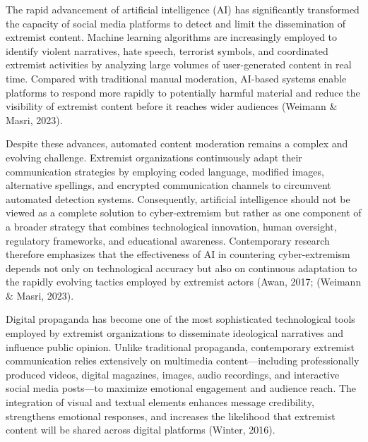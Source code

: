 \documentclass[10pt]{NSP1}
\begin{document}
\par\medskip{}\smallskip

The rapid advancement of artificial intelligence (AI) has significantly transformed the capacity of social media platforms to detect and limit the dissemination of extremist content. Machine learning algorithms are increasingly employed to identify violent narratives, hate speech, terrorist symbols, and coordinated extremist activities by analyzing large volumes of user-generated content in real time. Compared with traditional manual moderation, AI-based systems enable platforms to respond more rapidly to potentially harmful material and reduce the visibility of extremist content before it reaches wider audiences (Weimann \& Masri, 2023).

Despite these advances, automated content moderation remains a complex and evolving challenge. Extremist organizations continuously adapt their communication strategies by employing coded language, modified images, alternative spellings, and encrypted communication channels to circumvent automated detection systems. Consequently, artificial intelligence should not be viewed as a complete solution to cyber-extremism but rather as one component of a broader strategy that combines technological innovation, human oversight, regulatory frameworks, and educational awareness. Contemporary research therefore emphasizes that the effectiveness of AI in countering cyber-extremism depends not only on technological accuracy but also on continuous adaptation to the rapidly evolving tactics employed by extremist actors (Awan, 2017; (Weimann \& Masri, 2023).

\par\medskip{}\smallskip

Digital propaganda has become one of the most sophisticated technological tools employed by extremist organizations to disseminate ideological narratives and influence public opinion. Unlike traditional propaganda, contemporary extremist communication relies extensively on multimedia content—including professionally produced videos, digital magazines, images, audio recordings, and interactive social media posts—to maximize emotional engagement and audience reach. The integration of visual and textual elements enhances message credibility, strengthens emotional responses, and increases the likelihood that extremist content will be shared across digital platforms (Winter, 2016).
\end{document}
